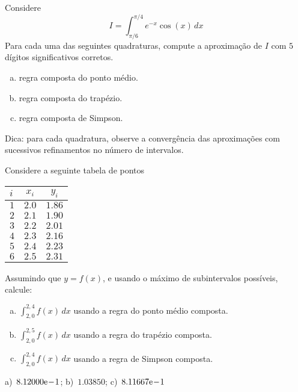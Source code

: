 \begin{exer}
  Considere
  \begin{equation}
    I = \int_{\pi/6}^{\pi/4} e^{-x}\cos(x)\,dx
  \end{equation}
  Para cada uma das seguintes quadraturas, compute a aproximação de $I$ com $5$ dígitos significativos corretos.
  \begin{enumerate}[a)]
  \item regra composta do ponto médio.
  \item regra composta do trapézio.
  \item regra composta de Simpson.
  \end{enumerate}
\end{exer}
\begin{resp}
  Dica: para cada quadratura, observe a convergência das aproximações com sucessivos refinamentos no número de intervalos.
\end{resp}

\begin{exer}
  Considere a seguinte tabela de pontos
  \begin{center}
    \begin{tabular}{l|cc}\toprule
      $i$ & $x_i$ & $y_i$\\\midrule
      $1$ & $2.0$ & $1.86$\\
      $2$ & $2.1$ & $1.90$\\
      $3$ & $2.2$ & $2.01$\\
      $4$ & $2.3$ & $2.16$\\
      $5$ & $2.4$ & $2.23$\\
      $6$ & $2.5$ & $2.31$\\\bottomrule
    \end{tabular}
  \end{center}
  Assumindo que $y = f(x)$, e usando o máximo de subintervalos possíveis, calcule:
  \begin{enumerate}[a)]
  \item $\displaystyle \int_{2,0}^{2,4} f(x)\,dx$ usando a regra do ponto médio composta.
  \item $\displaystyle \int_{2,0}^{2,5} f(x)\,dx$ usando a regra do trapézio composta.
  \item $\displaystyle \int_{2,0}^{2,4} f(x)\,dx$ usando a regra de Simpson composta.
  \end{enumerate}
\end{exer}
\begin{resp}
  a)~$8.12000\mathrm{e}\!-\!1$; b)~$1.03850$; c)~$8.11667\mathrm{e}\!-\!1$
\end{resp}

